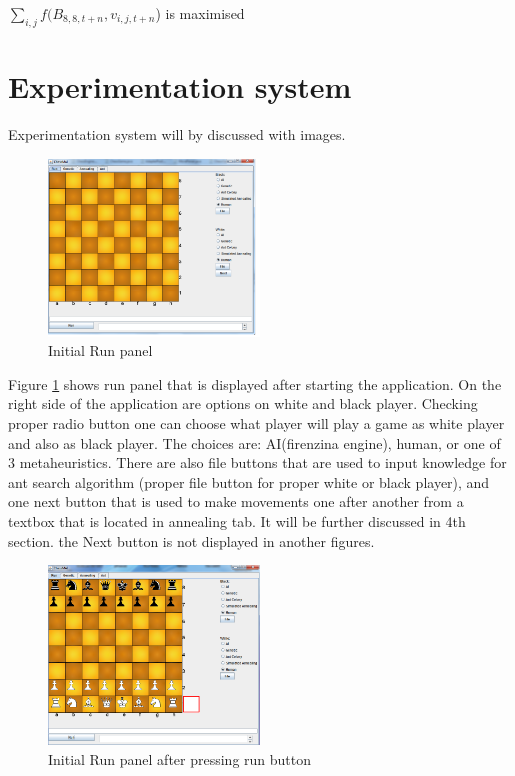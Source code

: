\documentclass[pdftex]{article}
\begin{document}
$\sum_{i,j} f(B_{8,8,t+n},v_{i,j,t+n}$) is maximised

\section{Experimentation system}
\label{sec:project}

Experimentation system will by discussed with images.

\begin{figure}[!htb]
	\centering
	\includegraphics[width=0.5\textwidth]{chessImages/Initial.png} 
	\caption{Initial Run panel}
	\label{fig:initialRunPanel}
\end{figure}

Figure \ref{fig:initialRunPanel} shows run panel that is displayed after starting the application. On the right side of the application are options on white and black player. Checking proper radio button one can choose what player will play a game as white player and also as black player. The choices are: AI(firenzina engine), human, or one of 3 metaheuristics. There are also file buttons that are used to input knowledge for ant search algorithm (proper file button for proper white or black player), and one next button that is used to make movements one after another from a textbox that is located in annealing tab. It will be further discussed in 4th section. the Next button is not displayed in another figures.

\begin{figure}[!htb]
	\centering
	\includegraphics[width=0.5\textwidth]{chessImages/InitialAfterRun.png} 
	\caption{Initial Run panel after pressing run button}
	\label{fig:initialRunPanelAfterRun}
\end{figure}
\end{document}

